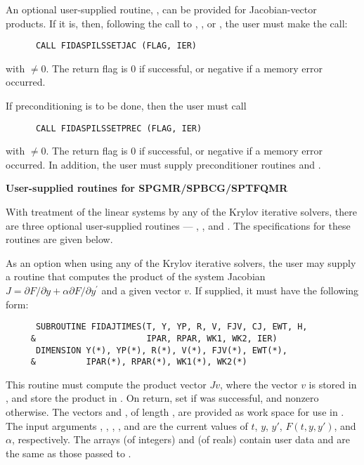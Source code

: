 \begin{Steps}
  An optional user-supplied routine, , can be provided for
  Jacobian-vector products.  If it is, then, following the call to
  , , or , the user must make the call:
\begin{verbatim}
      CALL FIDASPILSSETJAC (FLAG, IER)
\end{verbatim}
  with  $\neq 0$.  The return flag  is 0 if successful,
  or negative if a memory error occurred.

  If preconditioning is to be done, then the user must call
\begin{verbatim}
      CALL FIDASPILSSETPREC (FLAG, IER)
\end{verbatim}
  with  $\neq 0$.  The return flag  is 0 if successful,
  or negative if a memory error occurred.  In addition, the user must
  supply preconditioner routines  and .


  {\s}{\p} {\bf User-supplied routines for SPGMR/SPBCG/SPTFQMR}

  With treatment of the linear systems by any of the Krylov iterative
  solvers, there are three optional user-supplied routines ---
  , , and .  The specifications
  for these routines are given below.

  As an option when using any of the Krylov iterative solvers, the user may
  supply a routine that computes the product of the system Jacobian
  $J = \partial F / \partial y + \alpha \partial F / \partial y^\prime$
  and a given vector $v$.  If supplied, it must have the following form:
\begin{verbatim}
      SUBROUTINE FIDAJTIMES(T, Y, YP, R, V, FJV, CJ, EWT, H, 
     &                      IPAR, RPAR, WK1, WK2, IER)
      DIMENSION Y(*), YP(*), R(*), V(*), FJV(*), EWT(*), 
     &          IPAR(*), RPAR(*), WK1(*), WK2(*)
\end{verbatim}
  This routine must compute the product vector $Jv$, where the vector $v$ is
  stored in , and store the product in .  On return, set
   if  was successful, and nonzero otherwise.
  The vectors  and , of length , are
  provided as work space for use in .
  The input arguments , , , , and  are the
  current values of $t$, $y$, $y'$, $F(t,y,y')$, and $\alpha$, respectively.
  The arrays  (of integers) and  (of reals) contain user data
  and are the same as those passed to .


\end{Steps}
